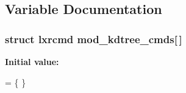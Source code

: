\subsection{Variable Documentation}
\hypertarget{kdtree-util_8c_a6d6d4e6caae0bbbe6c59f4faf2d7cbd6}{
\subsubsection[{mod\+\_\+kdtree\+\_\+cmds}]{\setlength{\rightskip}{0pt plus 5cm}struct lxrcmd mod\+\_\+kdtree\+\_\+cmds\mbox{[}$\,$\mbox{]}}}\label{kdtree-util_8c_a6d6d4e6caae0bbbe6c59f4faf2d7cbd6}
{\bfseries Initial value\+:}
\begin{DoxyCode}
= \{
\}
\end{DoxyCode}
